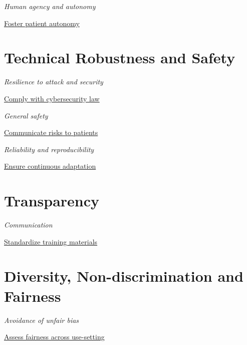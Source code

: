 \documentclass[
  letterpaper,
  DIV=11,
  numbers=noendperiod]{scrreport}
\begin{document}

\emph{Human agency and autonomy}

\protect\hyperlink{foster-patient-autonomy}{Foster patient autonomy}

\hypertarget{technical-robustness-and-safety-6}{%
\section*{Technical Robustness and
Safety}\label{technical-robustness-and-safety-6}}


\emph{Resilience to attack and security}

\protect\hyperlink{comply-with-cybersecurity-law}{Comply with
cybersecurity law}

\emph{General safety}

\protect\hyperlink{communicate-risks-to-patients}{Communicate risks to
patients}

\emph{Reliability and reproducibility}

\protect\hyperlink{ensure-continuous-adaptation}{Ensure continuous
adaptation}

\hypertarget{transparency-3}{%
\section*{Transparency}\label{transparency-3}}


\emph{Communication}

\protect\hyperlink{standardize-training-materials}{Standardize training
materials}

\hypertarget{diversity-non-discrimination-and-fairness-6}{%
\section*{Diversity, Non-discrimination and
Fairness}\label{diversity-non-discrimination-and-fairness-6}}


\emph{Avoidance of unfair bias}

\protect\hyperlink{assess-fairness-across-use-setting}{Assess fairness
across use-setting}
\end{document}
